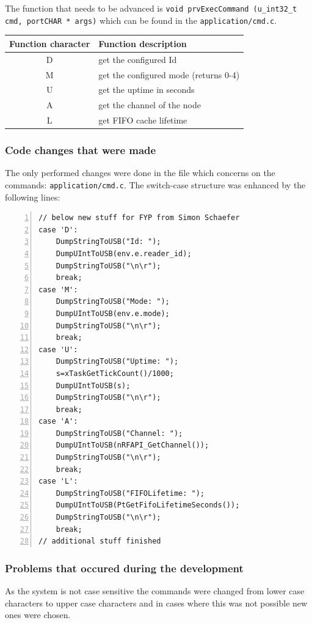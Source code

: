    The function that needs to be advanced is \texttt{void prvExecCommand (u\_int32\_t cmd, portCHAR * args)} which can be found in the \verb=application/cmd.c=.

   \begin{center}
    \begin{tabular}{|c|l|}
     \hline
      Function character	& Function description \\
     \hline
     \hline
      D & get the configured Id\\
      M & get the configured mode (returns 0-4) \\
      U & get the uptime in seconds \\
      A & get the channel of the node \\
      L & get FIFO cache lifetime\\
     \hline
    \end{tabular}
   \end{center}

   \subsubsection*{Code changes that were made}
    The only performed changes were done in the file which concerns on the commands: \verb=application/cmd.c=. The switch-case structure was enhanced by the following lines:
    \begin{lstlisting}[frame=single,breaklines,basicstyle=\footnotesize,numbers=left,label=lst:firmwareExtendedCommands,captionpos=b,caption={inserted source to application/cmd.c}]
// below new stuff for FYP from Simon Schaefer
case 'D':
	DumpStringToUSB("Id: ");
	DumpUIntToUSB(env.e.reader_id);
	DumpStringToUSB("\n\r");
	break;
case 'M':
	DumpStringToUSB("Mode: ");
	DumpUIntToUSB(env.e.mode);
	DumpStringToUSB("\n\r");
	break;
case 'U':
	DumpStringToUSB("Uptime: ");
	s=xTaskGetTickCount()/1000;
	DumpUIntToUSB(s);
	DumpStringToUSB("\n\r");
	break;
case 'A':
	DumpStringToUSB("Channel: ");
	DumpUIntToUSB(nRFAPI_GetChannel());
	DumpStringToUSB("\n\r");
	break;
case 'L':
	DumpStringToUSB("FIFOLifetime: ");
	DumpUIntToUSB(PtGetFifoLifetimeSeconds());
	DumpStringToUSB("\n\r");
	break;
// additional stuff finished
    \end{lstlisting}

   \subsubsection*{Problems that occured during the development}
    As the system is not case sensitive the commands were changed from lower case characters to upper case characters and in cases where this was not possible new ones were chosen.

